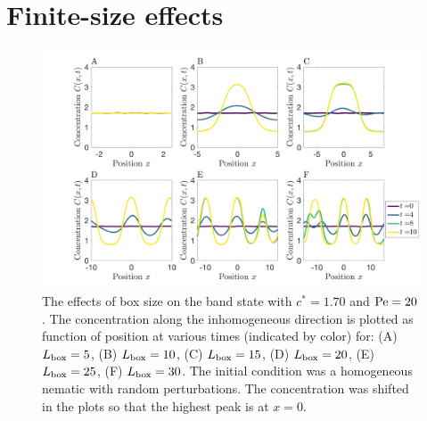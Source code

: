 \section{Finite-size effects}
\begin{figure}[!ht]
	\centering
  \includegraphics[width=1.00\textwidth]{figs/ch05_valid/box_size_compare_eq.png}
  \caption[Finite-size effects: homogeneous nematic initial condition]
  {The effects of box size on the band state with $c^*=1.70$ and $\text{Pe} = 20$. 
  The concentration along
  the inhomogeneous direction is plotted as function of position
  at various times (indicated by color) for: 
  (A) $L_{\mathrm{box}}=5$, (B) $L_{\mathrm{box}}=10$, 
  (C) $L_{\mathrm{box}}=15$, (D) $L_{\mathrm{box}}=20$, (E)
  $L_{\mathrm{box}}=25$, (F) $L_{\mathrm{box}}=30$. 
  The initial condition was a homogeneous nematic with
  random perturbations. The concentration was
  shifted in the plots so that the highest peak is at $x=0$.}\label{fig:box_size_eq}
\end{figure}
